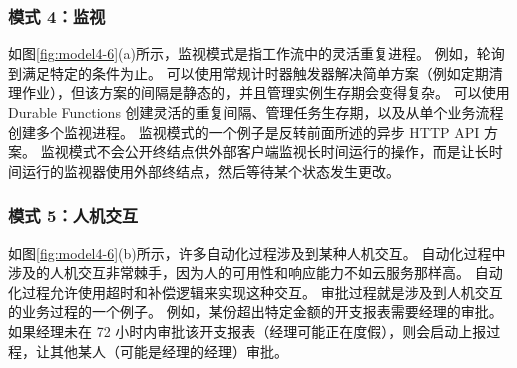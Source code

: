 \subsubsection{模式 4：监视}
如图\ref{fig:model4-6}(a)所示，监视模式是指工作流中的灵活重复进程。 例如，轮询到满足特定的条件为止。 可以使用常规计时器触发器解决简单方案（例如定期清理作业），但该方案的间隔是静态的，并且管理实例生存期会变得复杂。 可以使用 Durable Functions 创建灵活的重复间隔、管理任务生存期，以及从单个业务流程创建多个监视进程。
监视模式的一个例子是反转前面所述的异步 HTTP API 方案。 监视模式不会公开终结点供外部客户端监视长时间运行的操作，而是让长时间运行的监视器使用外部终结点，然后等待某个状态发生更改。

\subsubsection{模式 5：人机交互}
如图\ref{fig:model4-6}(b)所示，许多自动化过程涉及到某种人机交互。 自动化过程中涉及的人机交互非常棘手，因为人的可用性和响应能力不如云服务那样高。 自动化过程允许使用超时和补偿逻辑来实现这种交互。
审批过程就是涉及到人机交互的业务过程的一个例子。 例如，某份超出特定金额的开支报表需要经理的审批。 如果经理未在 72 小时内审批该开支报表（经理可能正在度假），则会启动上报过程，让其他某人（可能是经理的经理）审批。
